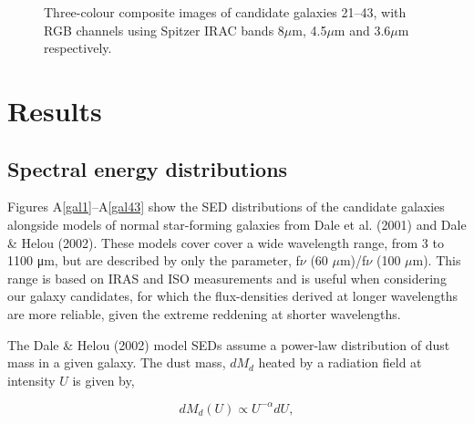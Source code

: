 \documentclass[times,usenatbib]{mn2e}
\begin{document}
\begin{figure}
\begin{center}
\caption{Three-colour composite images of candidate galaxies 21--43, with RGB channels using Spitzer IRAC bands 8$\mu$m, 4.5$\mu$m and 3.6$\mu$m respectively.}
\label{gallery2}
\end{center}
\end{figure} 

\section{Results}

\subsection{Spectral energy distributions}

Figures A\ref{gal1}--A\ref{gal43} show the SED distributions of the candidate galaxies alongside models of normal star-forming galaxies from Dale et al. (2001) and Dale \& Helou (2002). These models cover cover a wide wavelength range, from 3 to 1100 μm, but are described by only the parameter, f$\nu$ (60 $\mu$m)/f$\nu$ (100 $\mu$m). This range is based on IRAS and ISO measurements and is useful when considering our galaxy candidates, for which the flux-densities derived at longer wavelengths are more reliable, given the extreme reddening at shorter wavelengths.

The Dale \& Helou (2002) model SEDs assume a power-law distribution of dust mass in a given galaxy. The dust mass, $dM_{d}$ heated by a radiation field at intensity $U$ is given by,

\begin{equation}
dM_{d}(U) \propto U^{-\alpha}dU,
\label{cdale-model}
\end{equation}
\end{document}
